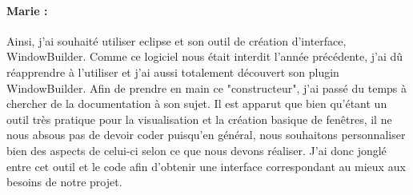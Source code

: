 \paragraph{Marie : }Ainsi, j'ai souhaité utiliser eclipse et son outil de création d'interface, WindowBuilder. Comme ce logiciel nous était interdit l'année précédente, j'ai dû réapprendre à l'utiliser et j'ai aussi totalement découvert son plugin WindowBuilder. Afin de prendre en main ce "constructeur", j'ai passé du temps à chercher de la documentation à son sujet. Il est apparut que bien qu'étant un outil très pratique pour la visualisation et la création basique de fenêtres, il ne nous absous pas de devoir coder puisqu'en général, nous souhaitons personnaliser bien des aspects de celui-ci selon ce que nous devons réaliser. J'ai donc jonglé entre cet outil et le code afin d'obtenir une interface correspondant au mieux aux besoins de notre projet.
